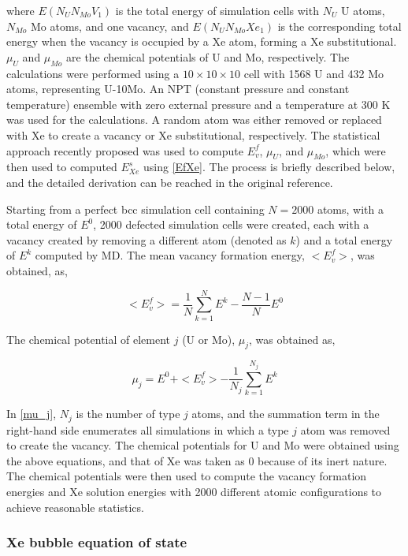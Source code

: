 \documentclass[review]{elsarticle}
\begin{document}
\noindent where $E(N_UN_{Mo}V_1)$ is the total energy of simulation cells with $N_U$ U atoms, $N_{Mo}$ Mo atoms, and one vacancy, and $E(N_UN_{Mo}Xe_1)$ is the corresponding total energy when the vacancy is occupied by a Xe atom, forming a Xe substitutional. $\mu_U$ and $\mu_{Mo}$ are the chemical potentials of U and Mo, respectively. The calculations were performed using a $10\times10\times10$ cell with 1568 U and 432 Mo atoms, representing U-10Mo. An NPT (constant pressure and constant temperature) ensemble with zero external pressure and a temperature at 300 K was used for the calculations. A random atom was either removed or replaced with Xe to create a vacancy or Xe substitutional, respectively. The statistical approach recently proposed \cite{zhang2021} was used to compute $E_v^f$, $\mu_U$, and $\mu_{Mo}$, which were then used to computed $E^s_{Xe}$ using \cref{EfXe}. The process is briefly described below, and the detailed derivation can be reached in the original reference. 

Starting from a perfect bcc simulation cell containing $N=2000$ atoms, with a total energy of $E^0$, 2000 defected simulation cells were created, each with a vacancy created by removing a different atom (denoted as $k$) and a total energy of $E^k$ computed by MD. The mean vacancy formation energy, $<E^f_v>$, was obtained, as,

\begin{equation}\label{mean_Efv}
<E^f_v> = \frac{1}{N}\sum_{k=1}^{N} E^k -\frac{N-1}{N}E^0   
\end{equation}

The chemical potential of element $j$ (U or Mo), $\mu_j$, was obtained as, 

\begin{equation}\label{mu_j}
\mu_j=E^0+<E^f_v> - \frac{1}{N_j}\sum_{k=1}^{N_j} E^k   
\end{equation}

In \cref{mu_j}, $N_j$ is the number of type $j$ atoms, and the summation term in the right-hand side enumerates all simulations in which a type $j$ atom was removed to create the vacancy. The chemical potentials for U and Mo were obtained using the above equations, and that of Xe was taken as 0 because of its inert nature. The chemical potentials were then used to compute the vacancy formation energies and Xe solution energies with 2000 different atomic configurations to achieve reasonable statistics. 

\subsubsection{Xe bubble equation of state}
\end{document}

